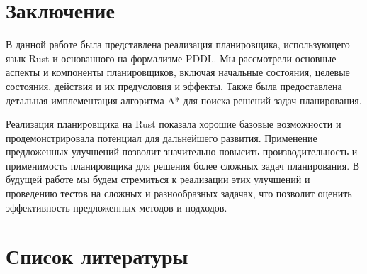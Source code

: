 \documentclass{article}
\begin{document}
\section{Заключение}

В данной работе была представлена реализация планировщика,
использующего язык Rust и основанного на формализме PDDL.
Мы рассмотрели основные аспекты и компоненты планировщиков,
включая начальные состояния, целевые состояния, действия и их предусловия и эффекты.
Также была предоставлена детальная имплементация алгоритма A* для поиска решений задач планирования.

Реализация планировщика на Rust показала хорошие базовые возможности 
и продемонстрировала потенциал для дальнейшего развития.
Применение предложенных улучшений позволит значительно повысить производительность
и применимость планировщика для решения более сложных задач планирования.
В будущей работе мы будем стремиться к реализации этих улучшений
и проведению тестов на сложных и разнообразных задачах,
что позволит оценить эффективность предложенных методов и подходов.

\newpage

\section{Список литературы}
\printbibliography [heading=none]
\end{document}
